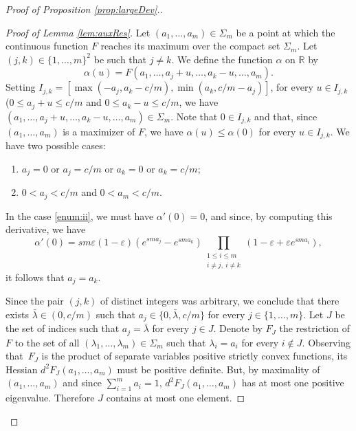 \documentclass[10pt]{amsart}
\newenvironment{enumeratei}
{\bgroup\def\theenumi{\roman{enumi}}\def\theenumii{\arabic{enumii}}\begin{enumerate}}
{\end{enumerate}\egroup}
\def\R{\mathbb{R}}
\theoremstyle{definition}
\begin{document}
\begin{proof}[Proof of Proposition \ref{prop:largeDev}.]
\begin{proof}[Proof of Lemma \ref{lem:auxRes}]
Let $(a_1,\dots, a_m)\in\Sigma_m$ be a point at which the continuous function $F$ reaches its maximum over the compact set $\Sigma_m$. Let $(j,k) \in \{1,\ldots,m\}^2$ be such that $j \neq k$. We define the function $\alpha$ on $\R$ by
\[
\alpha(u) = F(a_1, \ldots, a_j+u, \ldots, a_k - u, \ldots, a_m).
\]
Setting $I_{j,k}=[\max (-a_j,a_k-c/m),\min (a_k,c/m-a_j)]$, for every $u\in I_{j,k}$ (\ie $0 \leq a_j +u \leq c/m$ and $0 \leq a_k -u \leq c/m$, we have $(a_1, \ldots, a_j+u, \ldots, a_k - u, \ldots, a_m)\in\Sigma_m$. Note that $0\in I_{j,k}$ and that, since $(a_1, \ldots, a_m)$ is a maximizer of $F$, we have $\alpha(u)\leq \alpha(0)$ for every $u\in I_{j,k}$.
We have two possible cases:
\begin{enumeratei}
\item\label{enum:i}
$a_j=0$ or $a_j=c/m$ or $a_k=0$ or $a_k=c/m$;
\item\label{enum:ii}
$0<a_j<c/m$ and $0<a_m<c/m$.
\end{enumeratei}
In the case \eqref{enum:ii}, we must have $\alpha'(0)=0$, and since, by computing this derivative, we have
\[
\alpha'(0) =sm \varepsilon (1-\varepsilon) \left( e^{sm a_j} - e^{sm a_k } \right)\prod_{\substack{1 \leq i \leq m \\ i \neq j, \ i \not =k }}( 1-\varepsilon + \varepsilon e^{sma_{i}}),
\]
it follows that $a_j=a_k$.

Since the pair $(j,k)$ of distinct integers was arbitrary, we conclude that there exists $\bar \lambda\in (0,c/m)$ such that $a_j\in \{0,\bar\lambda, c/m\}$ for every $j\in \{1,\ldots,m\}$. Let $J$ be the set of indices such that $a_j=\bar \lambda$ for every $j\in J$. Denote by $F_J$ the restriction of $F$ to the set of all $(\lambda_1,\ldots,\lambda_m)\in\Sigma_m$ such that $\lambda_i=a_i$ for every $i\notin J$.
Observing that~$F_J$ is the product of separate variables positive strictly convex functions, its Hessian $d^2F_J(a_1,\dots,a_m)$ must be positive definite. But, by maximality of $(a_1,\dots,a_m)$ and since $\sum_{i=1}^ma_i=1$, $d^2F_J(a_1,\dots,a_m)$ has at most one positive eigenvalue. Therefore $J$ contains at most one element.


\end{proof}
\end{proof}
\end{document}
